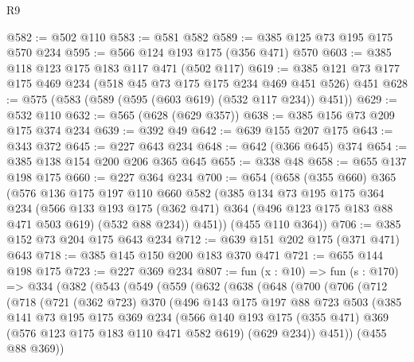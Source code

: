 \begin{lexlean}{R9}
\begin{coremodule}
@582 := @502 @110
@583 := @581 @582
@589 := @385 @125 @73 @195 @175 @570 @234
@595 := @566 @124 @193 @175 (@356 @471) @570
@603 := @385 @118 @123 @175 @183 @117 @471 (@502 @117)
@619 := @385 @121 @73 @177 @175 @469 @234 (@518 @45 @73 @175 @175 @234 @469 @451 @526) @451
@628 := @575 (@583 (@589 (@595 (@603 @619) (@532 @117 @234)) @451))
@629 := @532 @110
@632 := @565 (@628 (@629 @357))
@638 := @385 @156 @73 @209 @175 @374 @234
@639 := @392 @49
@642 := @639 @155 @207 @175
@643 := @343 @372
@645 := @227 @643 @234
@648 := @642 (@366 @645) @374
@654 := @385 @138 @154 @200 @206 @365 @645
@655 := @338 @48
@658 := @655 @137 @198 @175
@660 := @227 @364 @234
@700 := @654
    (@658
      (@355 @660)
      @365
      (@576
        @136
        @175
        @197
        @110
        @660
        @582
        (@385
          @134
          @73
          @195
          @175
          @364
          @234
          (@566
            @133
            @193
            @175
            (@362 @471)
            @364
            (@496 @123 @175 @183 @88 @471 @503 @619)
            (@532 @88 @234))
          @451))
      (@455 @110 @364))
@706 := @385 @152 @73 @204 @175 @643 @234
@712 := @639 @151 @202 @175 (@371 @471) @643
@718 := @385 @145 @150 @200 @183 @370 @471
@721 := @655 @144 @198 @175
@723 := @227 @369 @234
@807 := fun (x : @10) =>
  fun (s : @170) =>
  @334
    (@382
      (@543
        (@549
          (@559
            (@632
              (@638
                (@648
                  (@700
                    (@706
                      (@712
                        (@718
                          (@721
                            (@362 @723)
                            @370
                            (@496
                              @143
                              @175
                              @197
                              @88
                              @723
                              @503
                              (@385
                                @141
                                @73
                                @195
                                @175
                                @369
                                @234
                                (@566
                                  @140
                                  @193
                                  @175
                                  (@355 @471)
                                  @369
                                  (@576 @123 @175 @183 @110 @471 @582 @619)
                                  (@629 @234))
                                @451))
                            (@455 @88 @369))

\end{coremodule}
\end{lexlean}
